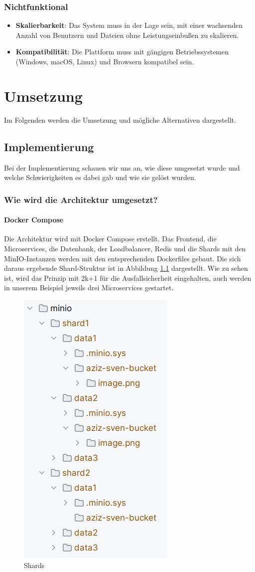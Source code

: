 \documentclass[12pt]{report}
\begin{document}
		\subsection{Nichtfunktional}
			\begin{itemize}
				\item \textbf{Skalierbarkeit}: Das System muss in der Lage sein, mit einer wachsenden Anzahl von Benutzern und Dateien ohne Leistungseinbußen zu skalieren.
				\item \textbf{Kompatibilität}: Die Plattform muss mit gängigen Betriebssystemen (Windows, macOS, Linux) und Browsern kompatibel sein.
			\end{itemize}

\chapter{Umsetzung}
	Im Folgenden werden die Umsetzung und mögliche Alternativen dargestellt.
	\section{Implementierung}
		Bei der Implementierung schauen wir uns an, wie diese umgesetzt wurde und welche Schwierigkeiten es dabei gab und wie sie gelöst wurden.
		\subsection{Wie wird die Architektur umgesetzt?}
			\subsubsection{Docker Compose}
				Die Architektur wird mit Docker Compose erstellt. Das Frontend, die Microservices, die Datenbank, der Loadbalancer, Redis und die Shards mit den MinIO-Instanzen werden mit den entsprechenden Dockerfiles gebaut. Die sich daraus ergebende Shard-Struktur ist in Abbildung \ref{fig:shards} dargestellt. Wie zu sehen ist, wird das Prinzip mit 2k+1 für die Ausfallsicherheit eingehalten, auch werden in unserem Beispiel jeweils drei Microservices gestartet.
		
				\begin{figure}[h]
					\centering
					\includegraphics[width=0.4\linewidth]{shards}
					\caption{Shards}
					\label{fig:shards}
				\end{figure}
			
\end{document}

